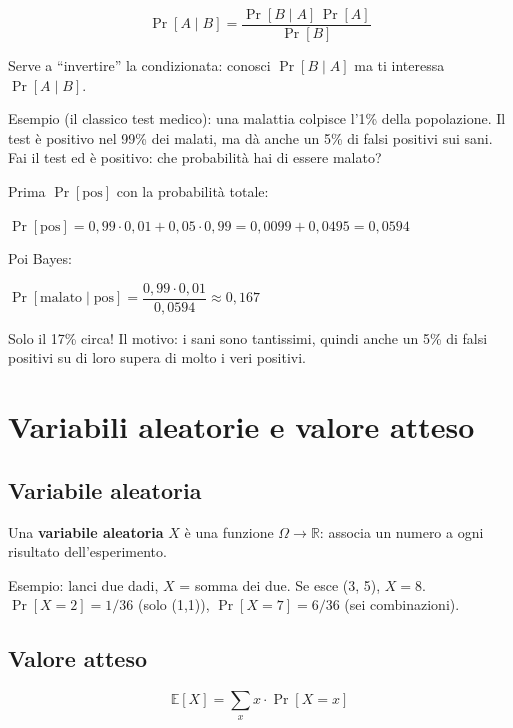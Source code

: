 \[
\Pr[A \mid B] = \frac{\Pr[B \mid A]\,\Pr[A]}{\Pr[B]}
\]

Serve a ``invertire'' la condizionata: conosci \(\Pr[B \mid A]\) ma ti interessa \(\Pr[A \mid B]\).

\begin{esempio}

Esempio (il classico test medico): una malattia colpisce l'1\% della popolazione. Il test è positivo nel 99\% dei malati, ma dà anche un 5\% di falsi positivi sui sani. Fai il test ed è positivo: che probabilità hai di essere malato?

Prima \(\Pr[\text{pos}]\) con la probabilità totale:

\(\Pr[\text{pos}] = 0{,}99 \cdot 0{,}01 + 0{,}05 \cdot 0{,}99 = 0{,}0099 + 0{,}0495 = 0{,}0594\)

Poi Bayes:

\(\Pr[\text{malato} \mid \text{pos}] = \dfrac{0{,}99 \cdot 0{,}01}{0{,}0594} \approx 0{,}167\)

Solo il 17\% circa! Il motivo: i sani sono tantissimi, quindi anche un 5\% di falsi positivi su di loro supera di molto i veri positivi.

\end{esempio}

\section{Variabili aleatorie e valore atteso}

\subsection{Variabile aleatoria}

Una \textbf{variabile aleatoria} \(X\) è una funzione \(\Omega \to \mathbb{R}\): associa un numero a ogni risultato dell'esperimento.

\begin{esempio}

Esempio: lanci due dadi, \(X\) = somma dei due. Se esce (3, 5), \(X = 8\). \(\Pr[X = 2] = 1/36\) (solo (1,1)), \(\Pr[X = 7] = 6/36\) (sei combinazioni).

\end{esempio}

\subsection{Valore atteso}

\[
\mathbb{E}[X] = \sum_x x \cdot \Pr[X = x]
\]


